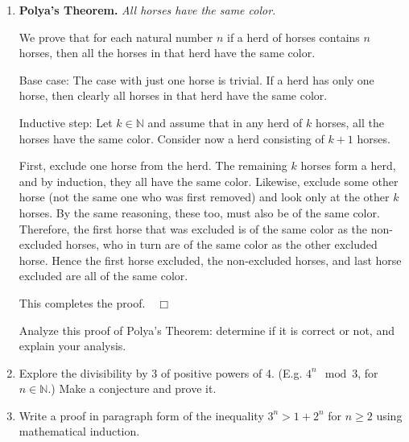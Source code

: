 \documentclass[12pt]{article}
\newcommand{\NN}{{\mathbb N}}  %
\begin{document}
\begin{enumerate}
\item {\color{Maroon}\bf Polya's Theorem.}  {\color{RoyalPurple}\sl All horses have the same color.}

  We prove that for each natural number $n$ if a herd of horses contains $n$ horses, then all the horses in that herd have the
  same color.

  {\color{Maroon}\sf Base case:}
   The case with just one horse is trivial. If a herd has only one horse, then clearly all horses in that herd have the same color.


   {\color{Maroon}\sf Inductive step:}
   Let $k\in \NN$ and assume that in any herd of $k$ horses, all the horses have the same color.
   Consider now a herd consisting of $k{+}1$ horses.

   First, exclude one horse from the herd.  The remaining $k$ horses form a herd, and by induction, they all have the same
   color.
   Likewise, exclude some other horse (not the same one who was first removed) and look only at the other $k$ horses.
   By the same reasoning, these too, must also be of the same color. Therefore, the first horse that was excluded is of the
   same color as the non-excluded horses, who in turn are of the same color as the other excluded horse. Hence the first
   horse excluded, the non-excluded horses, and last horse excluded are all of the same color.

   This completes the proof.\ \ $\Box$\bigskip

   {\color{blue}Analyze this proof of Polya's Theorem: determine if it is correct or not, and explain your analysis.}


\item Explore the divisibility by 3 of positive powers of 4.  (E.g. $4^n \mod 3$, for $n\in\NN$.)
        Make a conjecture and prove it.

\item Write a proof in paragraph form of the inequality
$3^n > 1+2^n$  for $n\geq 2$ using mathematical induction.




\end{enumerate}
\end{document}
